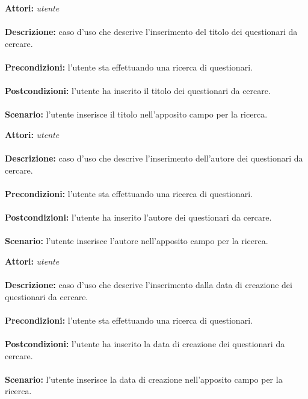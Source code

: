 \documentclass[a4paper,11pt]{article}
\begin{document}

\textbf{Attori:} \textit{utente}
\\ \\
\textbf{Descrizione:} caso d'uso che descrive l'inserimento del titolo dei questionari da cercare.\\
\\
\textbf{Precondizioni:} l'utente sta effettuando una ricerca di questionari.\\
\\
\textbf{Postcondizioni:} l’utente ha inserito il titolo dei questionari da cercare.\\
\\
\textbf{Scenario:} l’utente inserisce il titolo nell'apposito campo per la ricerca.\\



\textbf{Attori:} \textit{utente}
\\ \\
\textbf{Descrizione:} caso d'uso che descrive l'inserimento dell'autore dei questionari da cercare.\\
\\
\textbf{Precondizioni:} l'utente sta effettuando una ricerca di questionari.\\
\\
\textbf{Postcondizioni:} l’utente ha inserito l'autore dei questionari da cercare.\\
\\
\textbf{Scenario:} l’utente inserisce l'autore nell'apposito campo per la ricerca.\\



\textbf{Attori:} \textit{utente}
\\ \\
\textbf{Descrizione:} caso d'uso che descrive l'inserimento dalla data di creazione dei questionari da cercare.\\
\\
\textbf{Precondizioni:} l'utente sta effettuando una ricerca di questionari.\\
\\
\textbf{Postcondizioni:} l’utente ha inserito la data di creazione dei questionari da cercare.\\
\\
\textbf{Scenario:} l’utente inserisce la data di creazione nell'apposito campo per la ricerca.\\
\end{document}
